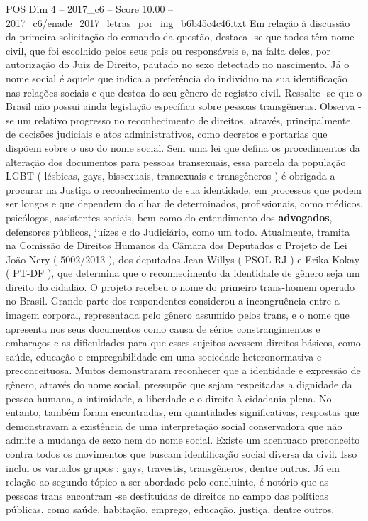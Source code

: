 \begin{textsample}{POS Dim 4 – 2017\_c6 – Score 10.00 – 2017\_c6/enade\_2017\_letras\_por\_ing\_b6b45c4c46.txt}
Em relação à discussão da primeira solicitação do comando da questão, destaca -se que todos têm nome civil, que foi escolhido pelos seus pais ou responsáveis e, na falta deles, por autorização do Juiz de Direito, pautado no sexo detectado no nascimento.
Já o nome social é aquele que indica a preferência do indivíduo na sua identificação nas relações sociais e que destoa do seu gênero de registro civil.
Ressalte -se que o Brasil não possui ainda legislação específica sobre pessoas transgêneras.
Observa -se um relativo progresso no reconhecimento de direitos, através, principalmente, de decisões judiciais e atos administrativos, como decretos e portarias que dispõem sobre o uso do nome social.
Sem uma lei que defina os procedimentos da alteração dos documentos para pessoas transexuais, essa parcela da população LGBT ( lésbicas, gays, bissexuais, transexuais e transgêneros ) é obrigada a procurar na Justiça o reconhecimento de sua identidade, em processos que podem ser longos e que dependem do olhar de determinados, profissionais, como médicos, psicólogos, assistentes sociais, bem como do entendimento dos \textbf{advogados}, defensores públicos, juízes e do Judiciário, como um todo.
Atualmente, tramita na Comissão de Direitos Humanos da Câmara dos Deputados o Projeto de Lei João Nery ( 5002/2013 ), dos deputados Jean Willys ( PSOL-RJ ) e Erika Kokay ( PT-DF ), que determina que o reconhecimento da identidade de gênero seja um direito do cidadão.
O projeto recebeu o nome do primeiro trans-homem operado no Brasil.
Grande parte dos respondentes considerou a incongruência entre a imagem corporal, representada pelo gênero assumido pelos trans, e o nome que apresenta nos seus documentos como causa de sérios constrangimentos e embaraços e as dificuldades para que esses sujeitos acessem direitos básicos, como saúde, educação e empregabilidade em uma sociedade heteronormativa e preconceituosa.
Muitos demonstraram reconhecer que a identidade e expressão de gênero, através do nome social, pressupõe que sejam respeitadas a dignidade da pessoa humana, a intimidade, a liberdade e o direito à cidadania plena.
No entanto, também foram encontradas, em quantidades significativas, respostas que demonstravam a existência de uma interpretação social conservadora que não admite a mudança de sexo nem do nome social.
Existe um acentuado preconceito contra todos os movimentos que buscam identificação social diversa da civil.
Isso inclui os variados grupos : gays, travestis, transgêneros, dentre outros.
Já em relação ao segundo tópico a ser abordado pelo concluinte, é notório que as pessoas trans encontram -se destituídas de direitos no campo das políticas públicas, como saúde, habitação, emprego, educação, justiça, dentre outros.

\end{textsample}
